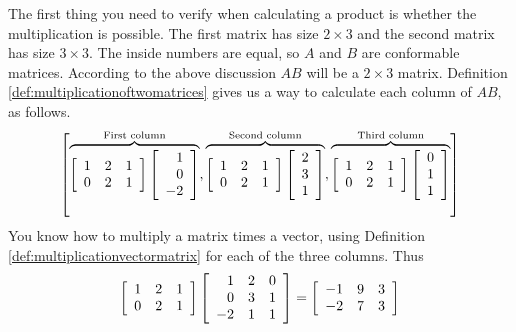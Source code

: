 \begin{solution} The first thing you need to verify when calculating a
product is whether the multiplication is possible.  The first matrix
has size $2\times 3$ and the second matrix has size $3\times 3$. The
inside numbers are equal, so $A$ and $B$ are conformable matrices.
According to the above discussion $AB$ will be a $2\times 3$ matrix.
Definition \ref{def:multiplicationoftwomatrices} gives us a way to
calculate each column of $AB$, as follows.
\begin{equation*}
\left[ \overset{
\text{First column}}{\overbrace{\left[
\begin{array}{rrr}
1 & 2 & 1 \\
0 & 2 & 1
\end{array}
\right] \left[
\begin{array}{r}
1 \\
0 \\
-2
\end{array}
\right] }},\overset{\text{Second column}}{\overbrace{\left[
\begin{array}{rrr}
1 & 2 & 1 \\
0 & 2 & 1
\end{array}
\right] \left[
\begin{array}{r}
2 \\
3 \\
1
\end{array}
\right] }},\overset{\text{Third column}}{\overbrace{\left[
\begin{array}{rrr}
1 & 2 & 1 \\
0 & 2 & 1
\end{array}
\right] \left[
\begin{array}{r}
0 \\
1 \\
1
\end{array}
\right] }}\right]
\end{equation*}
You know how to multiply a matrix times a vector, using Definition \ref{def:multiplicationvectormatrix} for 
each of the three columns. Thus
\begin{equation*}
\left[
\begin{array}{rrr}
1 & 2 & 1 \\
0 & 2 & 1
\end{array}
\right] \left[
\begin{array}{rrr}
1 & 2 & 0 \\
0 & 3 & 1 \\
-2 & 1 & 1
\end{array}
\right] =\allowbreak \left[
\begin{array}{rrr}
-1 & 9 & 3 \\
-2 & 7 & 3
\end{array}
\right] 
\end{equation*}
\end{solution}

